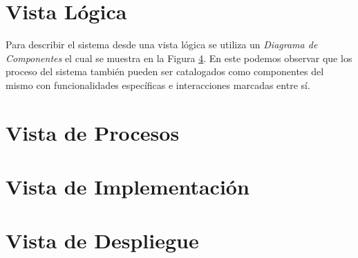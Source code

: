 \documentclass{scrreprt}
\begin{document}
\chapter{Vista Lógica}
Para describir el sistema desde una vista lógica se utiliza un \emph{Diagrama de Componentes} el cual se muestra en la Figura \ref{}. En este podemos observar que los proceso del sistema también pueden ser catalogados como componentes del mismo con funcionalidades específicas e interacciones marcadas entre sí. 


\chapter{Vista de Procesos}

\chapter{Vista de Implementación}

\chapter{Vista de Despliegue}
\end{document}
